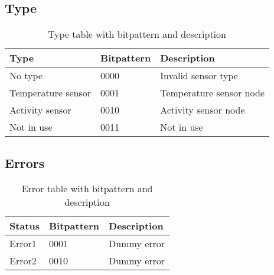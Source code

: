 \subsection{Type}
\begin{table}[H]
\centering
\begin{tabular}{|l|l|l|}
	\hline
	Type & Bitpattern & Description \\ 
	\hline
	No type 	& 0000 & Invalid sensor type \\
	\hline
	Temperature sensor & 0001 & Temperature sensor node \\
	\hline
	Activity sensor & 0010 & Activity sensor node \\
	\hline
	Not in use & 0011 & Not in use \\
	\hline
\end{tabular}
\caption{Type table with bitpattern and description}
\label{table:typetable}
\end{table}

\subsection{Errors}
\begin{table}[H]
\centering
\begin{tabular}{|l|l|l|}
	\hline
	Status & Bitpattern & Description \\ 
	\hline
	Error1 	& 0001  & Dummy error \\
	\hline
	Error2  & 0010  & Dummy error \\
	\hline
\end{tabular}
\caption{Error table with bitpattern and description}
\label{table:errortable}
\end{table}




